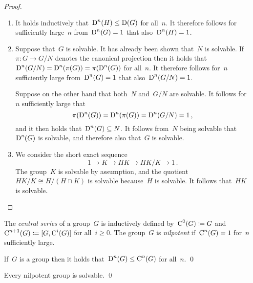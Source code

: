\begin{proof}
  \begin{enumerate}
    \item
      It holds inductively that~$\operatorname{D}^n(H) \leq \operatorname{D}(G)$ for all~$n$.
      It therefore follows for sufficiently large~$n$ from~$\operatorname{D}^n(G) = 1$ that also~$\operatorname{D}^n(H) = 1$.
    \item
      Suppose that~$G$ is solvable.
      It has already been shown that~$N$ is solvable.
      If~$\pi \colon G \to G/N$ denotes the canonical projection then it holds that~$\operatorname{D}^n(G/N) = \operatorname{D}^n(\pi(G)) = \pi(\operatorname{D}^n(G))$ for all~$n$.
      It therefore follows for~$n$ sufficiently large from~$\operatorname{D}^n(G) = 1$ that also~$\operatorname{D}^n(G/N) = 1$.
      
      Suppose on the other hand that both~$N$ and~$G/N$ are solvable.
      It follows for~$n$ sufficiently large that
      \[
          \pi( \operatorname{D}^n(G) )
        = \operatorname{D}^n( \pi(G) )
        = \operatorname{D}^n( G/N )
        = 1 \,,
      \]
      and it then holds that~$\operatorname{D}^n(G) \subseteq N$.
      It follows from~$N$ being solvable that~$\operatorname{D}^n(G)$ is solvable, and therefore also that~$G$ is solvable.
    \item
      We consider the short exact sequence
      \[
            1
        \to K
        \to HK
        \to HK/K
        \to 1 \,.
      \]
      The group~$K$ is solvable by assumption, and the quotient~$HK/K \cong H/(H \cap K)$ is solvable because~$H$ is solvable.
      It follows that~$HK$ is solvable.
    \qedhere
  \end{enumerate}
\end{proof}


\begin{definition}
  The \emph{central series} of a group~$G$ is inductively defined by~$\operatorname{C}^0(G) \coloneqq G$ and~$\operatorname{C}^{n+1}(G) \coloneqq [G, \operatorname{C}^i(G)]$ for all~$i \geq 0$.
  The group~$G$ is \emph{nilpotent} if~$\operatorname{C}^n(G) = 1$ for~$n$ sufficiently large.
\end{definition}


\begin{lemma}
  If~$G$ is a group then it holds that~$\operatorname{D}^n(G) \leq \operatorname{C}^n(G)$ for all~$n$.
  \qed
\end{lemma}


\begin{corollary}
  Every nilpotent group is solvable.
  \qed
\end{corollary}


